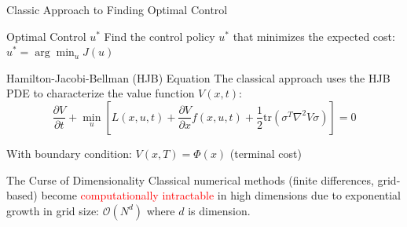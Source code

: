 \documentclass[aspectratio=169,xcolor=dvipsnames]{beamer}
\begin{document}
\begin{frame}{Classic Approach to Finding Optimal Control}
    \begin{block}{Optimal Control $u^*$}
        Find the control policy $u^*$ that minimizes the expected cost: $u^* = \arg\min_u J(u)$
    \end{block}
        
    \begin{block}{Hamilton-Jacobi-Bellman (HJB) Equation}
        The classical approach uses the HJB PDE to characterize the value function $V(x,t)$:
        \small
        \begin{equation}
        \frac{\partial V}{\partial t} + \min_u \left[ L(x,u,t) + \frac{\partial V}{\partial x} f(x,u,t) + \frac{1}{2}\text{tr}(\sigma^T \nabla^2 V \sigma) \right] = 0
        \end{equation}
        
        \vspace{0.2cm}
        With boundary condition: $V(x,T) = \Phi(x)$ (terminal cost)
    \end{block}
        
    \begin{alertblock}{The Curse of Dimensionality}
        Classical numerical methods (finite differences, grid-based) become \textcolor{red}{computationally intractable} in high dimensions due to exponential growth in grid size: $\mathcal{O}(N^d)$ where $d$ is dimension.
    \end{alertblock}

\end{frame}




\end{document}
